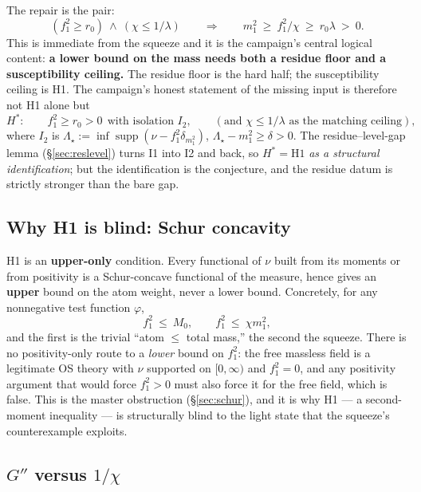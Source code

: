 The repair is the pair:
\begin{equation}
(f_1^2\ge r_0)\ \wedge\ (\chi\le1/\lambda)
\qquad\Longrightarrow\qquad
m_1^2\ \ge\ f_1^2/\chi\ \ge\ r_0\lambda\ >\ 0 .
\label{eq:sufficient}
\end{equation}
This is immediate from the squeeze and it is the campaign's central logical content: \textbf{a
lower bound on the mass needs both a residue floor and a susceptibility ceiling.} The residue
floor is the hard half; the susceptibility ceiling is H1. The campaign's honest statement of the
missing input is therefore not H1 alone but
\begin{equation}
H^*:\qquad f_1^2\ge r_0>0\ \ \text{with isolation } I_2,
\qquad(\text{and }\chi\le1/\lambda\text{ as the matching ceiling}),
\label{eq:hstar}
\end{equation}
where $I_2$ is $\Lambda_{\star}:=\inf\operatorname{supp}(\nu-f_1^2\delta_{m_1^2})$,
$\Lambda_{\star}-m_1^2\ge\delta>0$. The residue--level-gap lemma (\S\ref{sec:reslevel}) turns I1 into
I2 and back, so $H^*=\text{H1}$ \emph{as a structural identification}; but the identification is
the conjecture, and the residue datum is strictly stronger than the bare gap.

\subsection{Why H1 is blind: Schur concavity}

H1 is an \textbf{upper-only} condition. Every functional of $\nu$ built from its moments or from
positivity is a Schur-concave functional of the measure, hence gives an \textbf{upper} bound on
the atom weight, never a lower bound. Concretely, for any nonnegative test function $\varphi$,
\begin{equation}
f_1^2\ \le\ M_0,\qquad f_1^2\ \le\ \chi m_1^2 ,
\label{eq:schur}
\end{equation}
and the first is the trivial ``atom $\le$ total mass,'' the second the squeeze. There is no
positivity-only route to a \emph{lower} bound on $f_1^2$: the free massless field is a
legitimate OS theory with $\nu$ supported on $[0,\infty)$ and $f_1^2=0$, and any positivity
argument that would force $f_1^2>0$ must also force it for the free field, which is false. This
is the master obstruction (\S\ref{sec:schur}), and it is why H1 --- a second-moment inequality
--- is structurally blind to the light state that the squeeze's counterexample exploits.

\subsection{$G''$ versus $1/\chi$}

